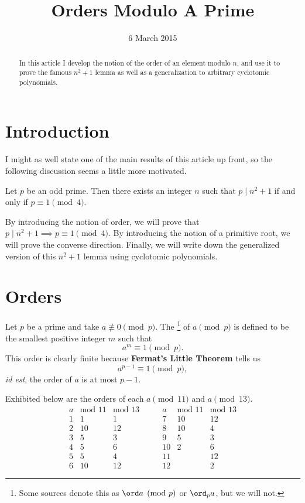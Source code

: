 \documentclass[11pt]{scrartcl}
\begin{document}
\title{Orders Modulo A Prime}
\date{6 March 2015}
\maketitle

\begin{abstract}
  In this article I develop the notion of the order of an element modulo $n$,
  and use it to prove the famous $n^2+1$ lemma as well as a generalization
  to arbitrary cyclotomic polynomials.
\end{abstract}

\section{Introduction}
I might as well state one of the main results of this article up front,
so the following discussion seems a little more motivated.
\begin{theorem}
  \label{thm:nn_plus_one}
  Let $p$ be an odd prime.
  Then there exists an integer $n$ such that $p \mid n^2+1$
  if and only if $p \equiv 1 \pmod 4$.
\end{theorem}
By introducing the notion of order, we will prove that $p \mid n^2+1 \implies p \equiv 1 \pmod 4$.
By introducing the notion of a primitive root, we will prove the converse direction.
Finally, we will write down the generalized version of this $n^2+1$ lemma using cyclotomic polynomials.

\section{Orders}
Let $p$ be a prime and take $a \not\equiv 0 \pmod p$.
The \footnote{Some sources denote this as $\ord a \pmod p$ or $\ord_p a$, but we will not.}
of $a \pmod p$ is defined to be the smallest positive integer $m$ such that
\[ a^m \equiv 1 \pmod p. \]
This order is clearly finite because \textbf{Fermat's Little Theorem} tells us
\[ a^{p-1} \equiv 1 \pmod p, \]
\emph{id est}, the order of $a$ is at most $p-1$.

Exhibited below are the orders of each $a \pmod{11}$ and $a \pmod{13}$.
\[
  \begin{array}{r|rr}
    a & \text{mod $11$} & \text{mod $13$} \\ \hline
    1  &  1 &  1 \\
    2  & 10 & 12 \\
    3  &  5 &  3 \\
    4  &  5 &  6 \\
    5  &  5 &  4 \\
    6  & 10 & 12
  \end{array}
  \qquad
  \begin{array}{r|rr}
    a & \text{mod $11$} & \text{mod $13$} \\ \hline
    7  & 10 & 12 \\
    8  & 10 &  4 \\
    9  &  5 &  3 \\
    10 &  2 &  6 \\
    11 &    & 12 \\
    12 &    &  2
  \end{array}
\]
\end{document}
